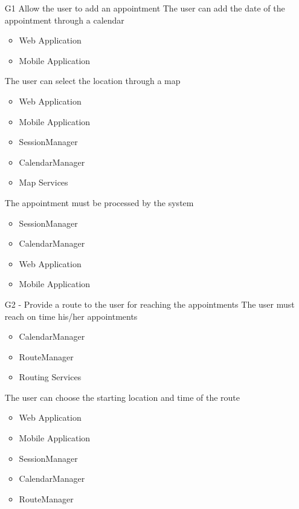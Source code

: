  
 
 
 
 \begin{itemize}
 	\item[G1] Allow the user to add an appointment
 	\subitem[G1.1] The user can add the date of the appointment through a calendar
 	\begin{itemize}[leftmargin=1in]
 		\item Web Application
 		\item Mobile Application
 	\end{itemize}
 	\subitem[G1.2] The user can select the location through a map
 	\begin{itemize}[leftmargin=1in]
 		\item Web Application
 		\item Mobile Application
 		\item SessionManager
 		\item CalendarManager
 		\item Map Services
 	\end{itemize}
 	\subitem[G1.3] The appointment must be processed by the system
 	\begin{itemize}[leftmargin=1in]
 		\item SessionManager
 		\item CalendarManager
 		\item Web Application
 		\item Mobile Application
 	\end{itemize}
 	\item[G2] - Provide a route to the user for reaching the appointments
 	\subitem[G2.1] The user must reach on time his/her appointments
 	\begin{itemize}[leftmargin=1in]
 		\item CalendarManager
 		\item RouteManager
 		\item Routing Services
 	\end{itemize}
 	\subitem[G2.2] The user can choose the starting location and time of the route
 	\begin{itemize}[leftmargin=1in]
 		\item Web Application
 		\item Mobile Application
 		\item SessionManager
 		\item CalendarManager
 		\item RouteManager

\end{itemize}
\end{itemize}
